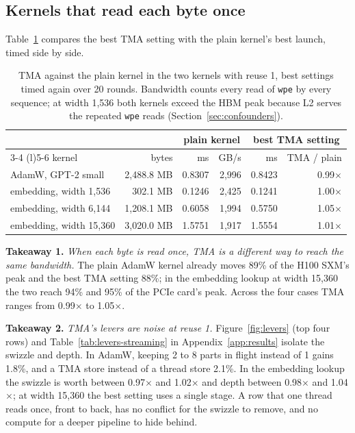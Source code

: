 \documentclass[10pt]{article}
\newcommand{\takeaway}[1]{\noindent\textbf{#1}}
\newcommand{\x}{\ensuremath{\times}}
\begin{document}
\subsection{Kernels that read each byte once}
\label{sec:streaming}

Table~\ref{tab:streaming} compares the best TMA setting with the plain kernel's best launch, timed side by side.

\begin{table}[t]
  \centering
  \caption{TMA against the plain kernel in the two kernels with reuse 1, best settings timed again over 20 rounds.
  Bandwidth counts every read of \texttt{wpe} by every sequence; at width 1{,}536 both kernels exceed the HBM peak because
  L2 serves the repeated \texttt{wpe} reads (Section~\ref{sec:confounders}).}
  \label{tab:streaming}
  \small
  \begin{tabular}{@{}lrrrrr@{}}
    \toprule
    & & \multicolumn{2}{c}{plain kernel} & \multicolumn{2}{c}{best TMA setting} \\
    \cmidrule(lr){3-4} \cmidrule(l){5-6}
    kernel & bytes & ms & GB/s & ms & TMA / plain \\
    \midrule
    AdamW, GPT-2 small            & 2{,}488.8 MB & 0.8307 & 2{,}996 & 0.8423 & 0.99\x{} \\
    embedding, width 1{,}536      & 302.1 MB     & 0.1246 & 2{,}425 & 0.1241 & 1.00\x{} \\
    embedding, width 6{,}144      & 1{,}208.1 MB & 0.6058 & 1{,}994 & 0.5750 & 1.05\x{} \\
    embedding, width 15{,}360     & 3{,}020.0 MB & 1.5751 & 1{,}917 & 1.5554 & 1.01\x{} \\
    \bottomrule
  \end{tabular}
\end{table}

\takeaway{Takeaway 1.} \emph{When each byte is read once, TMA is a different way to reach the same bandwidth.} The plain
AdamW kernel already moves 89\% of the H100 SXM's peak and the best TMA setting 88\%; in the embedding lookup at width
15{,}360 the two reach 94\% and 95\% of the PCIe card's peak. Across the four cases TMA ranges from 0.99\x{} to 1.05\x{}.

\takeaway{Takeaway 2.} \emph{TMA's levers are noise at reuse 1.} Figure~\ref{fig:levers} (top four rows) and
Table~\ref{tab:levers-streaming} in Appendix~\ref{app:results} isolate the swizzle and depth. In AdamW, keeping 2 to 8 parts
in flight instead of 1 gains 1.8\%, and a TMA store instead of a thread store 2.1\%. In the embedding lookup the swizzle
is worth between 0.97\x{} and 1.02\x{} and depth between 0.98\x{} and 1.04\x{}; at width 15{,}360 the best setting uses a
single stage. A row that one thread reads once, front to back, has no conflict for the swizzle to remove, and no compute
for a deeper pipeline to hide behind.
\end{document}
